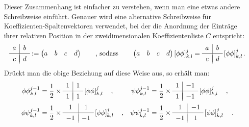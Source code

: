 %
Dieser Zusammenhang ist einfacher zu verstehen, wenn man eine etwas andere Schreibweise einführt. Genauer wird eine alternative Schreibweise für Koeffizienten-Spaltenvektoren verwendet, bei der die Anordnung der Einträge ihrer relativen Position in der zweidimensionalen Koeffizientenliste $C$ entspricht:
%
\[
\begin{array}{c|c}
a & b \\[.05cm] 
\hline \\[-0.35cm]
c & d
\end{array}
:=
\begin{pmatrix}
a & b & c & d
\end{pmatrix}
\qquad \mbox{, sodass} \qquad
\begin{pmatrix}
a & b & c & d
\end{pmatrix}
\left[ \phi\phi \right]_{k,l}^j
=
\begin{array}{c|c}
a & b \\[.05cm] 
\hline \\[-0.35cm]
c & d
\end{array}
\left[ \phi\phi \right]_{k,l}^j
.
\]
%
Drückt man die obige Beziehung auf diese Weise aus, so erhält man:
%
\begin{align*}
\phi\phi_{k,l}^{j-1} &=
\frac{1}{2} \times
\begin{array}{c|c}
1 & 1 \\[.05cm] 
\hline \\[-0.35cm]
1 & 1
\end{array}
\left[ \phi\phi \right]_{k,l}^j
\quad , &
\psi\phi_{k,l}^{j-1} &=
\frac{1}{2} \times
\begin{array}{c|c}
1 & -1 \\[.05cm] 
\hline \\[-0.35cm]
1 & -1
\end{array}
\left[ \phi\phi \right]_{k,l}^j
\quad , \\
\phi\psi_{k,l}^{j-1} &=
\frac{1}{2} \times
\begin{array}{c|c}
1 & 1 \\[.05cm] 
\hline \\[-0.35cm]
-1 & -1
\end{array}
\left[ \phi\phi \right]_{k,l}^j
\quad , &
\psi\psi_{k,l}^{j-1} &=
\frac{1}{2} \times
\begin{array}{c|c}
1 & -1 \\[.05cm] 
\hline \\[-0.35cm]
-1 & 1
\end{array}
\left[ \phi\phi \right]_{k,l}^j
\quad .
\end{align*}

